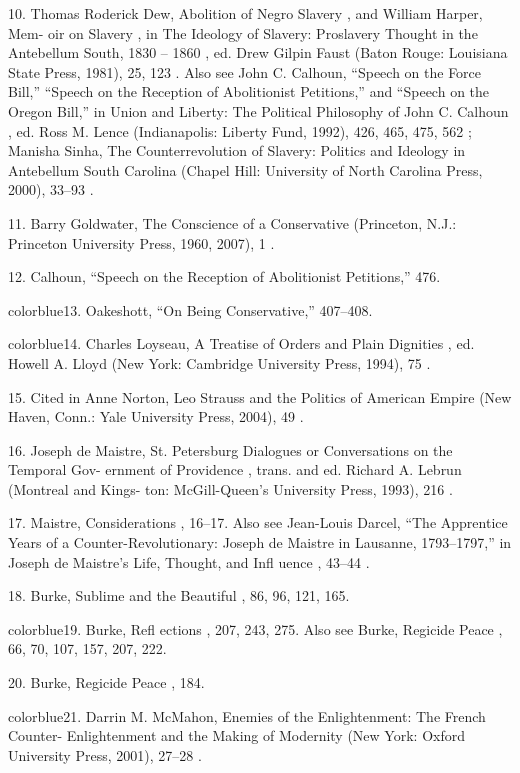 	{\color{blue}10}. Thomas Roderick Dew, Abolition of Negro Slavery , and William Harper, Mem- oir on Slavery , in The Ideology of Slavery: Proslavery Thought in the Antebellum South, 1830 – 1860 , ed. Drew Gilpin Faust (Baton Rouge: Louisiana State Press, 1981), 25, 123 . Also see John C. Calhoun, “Speech on the Force Bill,” “Speech on the Reception of Abolitionist Petitions,” and “Speech on the Oregon Bill,” in Union and Liberty: The Political Philosophy of John C. Calhoun , ed. Ross M. Lence (Indianapolis: Liberty Fund, 1992), 426, 465, 475, 562 ; Manisha Sinha, The Counterrevolution of Slavery: Politics and Ideology in Antebellum South Carolina (Chapel Hill: University of North Carolina Press, 2000), 33–93 .


	{\color{blue}11}. Barry Goldwater, The Conscience of a Conservative (Princeton, N.J.: Princeton University Press, 1960, 2007), 1 .


	{\color{blue}12}. Calhoun, “Speech on the Reception of Abolitionist Petitions,” 476.


	{color{blue}13}. Oakeshott, “On Being Conservative,” 407–408.


	{color{blue}14}. Charles Loyseau, A Treatise of Orders and Plain Dignities , ed. Howell A. Lloyd (New York: Cambridge University Press, 1994), 75 .


	{\color{blue}15}. Cited in Anne Norton, Leo Strauss and the Politics of American Empire (New Haven, Conn.: Yale University Press, 2004), 49 .


	{\color{blue}16}. Joseph de Maistre, St. Petersburg Dialogues or Conversations on the Temporal Gov- ernment of Providence , trans. and ed. Richard A. Lebrun (Montreal and Kings- ton: McGill-Queen’s University Press, 1993), 216 .


	{\color{blue}17}. Maistre, Considerations , 16–17. Also see Jean-Louis Darcel, “The Apprentice Years of a Counter-Revolutionary: Joseph de Maistre in Lausanne, 1793–1797,” in Joseph de Maistre’s Life, Thought, and Infl uence , 43–44 .


	{\color{blue}18}. Burke, Sublime and the Beautiful , 86, 96, 121, 165.


	{color{blue}19}. Burke, Refl ections , 207, 243, 275. Also see Burke, Regicide Peace , 66, 70, 107, 157, 207, 222.


	{\color{blue}20}. Burke, Regicide Peace , 184.


	{color{blue}21}. Darrin M. McMahon, Enemies of the Enlightenment: The French Counter- Enlightenment and the Making of Modernity (New York: Oxford University Press, 2001), 27–28 .


